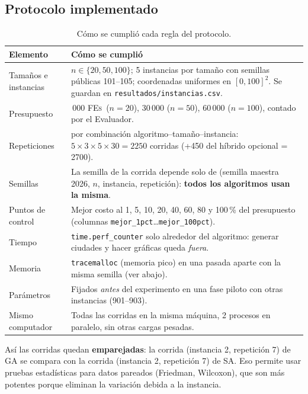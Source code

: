 \documentclass[11pt,a4paper]{article}
\newcommand{\FEs}{\textsc{FEs}}
\newcommand{\archivo}[1]{\texttt{#1}}
\begin{document}
\subsection{Protocolo implementado}
\begin{table}[H]\centering\small
\begin{tabular}{>{\raggedright}p{4.6cm}>{\raggedright\arraybackslash}p{10cm}}
\toprule
Elemento & Cómo se cumplió \\
\midrule
Tamaños e instancias & $n\in\{20,50,100\}$; 5 instancias por tamaño con semillas públicas 101--105; coordenadas uniformes en $[0,100]^2$. Se guardan en \archivo{resultados/instancias.csv}.\\
Presupuesto & 10\,000 \FEs\ ($n=20$), 30\,000 ($n=50$), 60\,000 ($n=100$), contado por el Evaluador.\\
Repeticiones & 30 por combinación algoritmo--tamaño--instancia: $5\times3\times5\times30=2250$ corridas (+450 del híbrido opcional = 2700).\\
Semillas & La semilla de la corrida depende solo de (semilla maestra 2026, $n$, instancia, repetición): \textbf{todos los algoritmos usan la misma}.\\
Puntos de control & Mejor costo al 1, 5, 10, 20, 40, 60, 80 y 100\,\% del presupuesto (columnas \texttt{mejor\_1pct}\dots\texttt{mejor\_100pct}).\\
Tiempo & \texttt{time.perf\_counter} solo alrededor del algoritmo: generar ciudades y hacer gráficas queda \emph{fuera}.\\
Memoria & \texttt{tracemalloc} (memoria pico) en una pasada aparte con la misma semilla (ver abajo).\\
Parámetros & Fijados \emph{antes} del experimento en una fase piloto con otras instancias (901--903).\\
Mismo computador & Todas las corridas en la misma máquina, 2 procesos en paralelo, sin otras cargas pesadas.\\
\bottomrule
\end{tabular}
\caption{Cómo se cumplió cada regla del protocolo.}
\end{table}

\begin{porque}
Así las corridas quedan \textbf{emparejadas}: la corrida (instancia 2, repetición 7) de GA se compara con la corrida (instancia 2, repetición 7)
de SA. Eso permite usar pruebas estadísticas para datos pareados (Friedman, Wilcoxon), que son más potentes porque eliminan la variación
debida a la instancia.
\end{porque}
\end{document}
